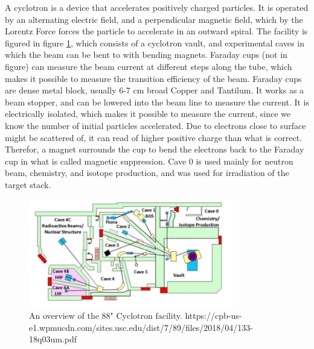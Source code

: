 \noindent 
A cyclotron is a device that accelerates positively charged particles. It is operated by an alternating electric field, and a perpendicular magnetic field, which by the Lorentz Force forces the particle to accelerate in an outward spiral. 
The facility is figured in figure \ref{fig:LBNL_88}, which consists of a cyclotron vault, and experimental caves in which the beam can be bent to with bending magnets. Faraday cups (not in figure) can measure the beam current at different steps along the tube, which makes it possible to measure the transition efficiency of the beam. Faraday cups are dense metal block, usually 6-7 cm broad Copper and Tantilum. It works as a beam stopper, and can be lowered into the beam line to measure the current. It is electrically isolated, which makes it possible to measure the current, since we know the number of initial particles accelerated. Due to electrons close to surface might be scattered of, it can read of higher positive charge than what is correct. Therefor, a magnet surrounds the cup to bend the electrons back to the Faraday cup in what is called magnetic suppression. Cave 0 is used mainly for neutron beam, chemistry, and isotope production, and was used for irradiation of the target stack.


\begin{figure}
    \centering
    \includegraphics[width=0.8\textwidth]{Experiment/LBL_88.png}
    \caption{An overview of the 88" Cyclotron facility. https://cpb-us-e1.wpmucdn.com/sites.usc.edu/dist/7/89/files/2018/04/133-18q03um.pdf }
    \label{fig:LBNL_88}
\end{figure}

